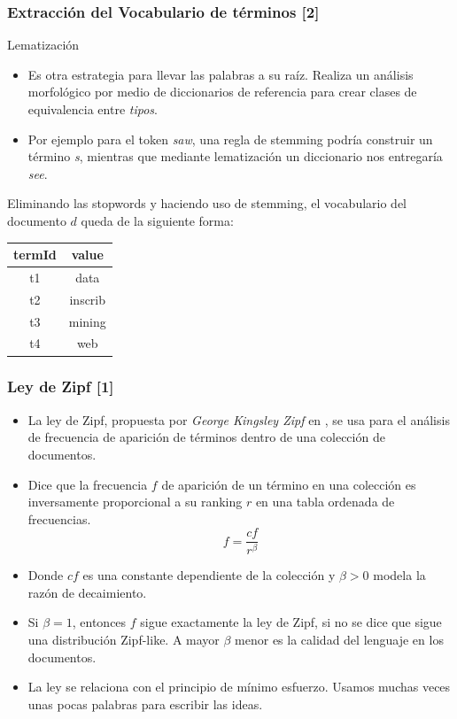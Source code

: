 \documentclass[mathserif]{beamer}
\begin{document}
\begin{frame}\frametitle{Extracción del Vocabulario de términos [2]}
\footnotesize{
 
\begin{block}{Lematización}
\begin{itemize}
 \item Es otra estrategia para llevar las palabras a su raíz. Realiza un análisis morfológico por medio de diccionarios de referencia para crear clases de equivalencia entre \emph{tipos}. 
\item Por ejemplo para el token \emph{saw}, una regla de stemming podría construir un término \emph{s}, mientras que mediante lematización un diccionario nos entregaría \emph{see}. 

\end{itemize}
\end{block}

Eliminando las stopwords y haciendo uso de stemming, el vocabulario del documento $d$ queda de la siguiente forma:

\begin{table}
\centering
\begin{tabular}{c|c}
\hline
termId & value \\ 
\hline
t1 & data \\ 
t2 & inscrib \\ 
t3 & mining \\ 
t4 & web \\ 
\hline
\end{tabular}
\end{table}

}
\end{frame}



\begin{frame}\frametitle{Ley de Zipf [1]}
\footnotesize{
\begin{itemize}
 \item La ley de Zipf, propuesta por \emph{George Kingsley Zipf} en \cite{zipf1935}, se usa para el análisis de frecuencia de aparición de términos dentro de una colección de documentos. 
\item Dice que la frecuencia $f$ de aparición de un término en una colección es inversamente proporcional a su ranking $r$ en una tabla ordenada de frecuencias.
\begin{equation}
	f = \frac{cf}{r^{\beta}}
\end{equation}
\item Donde $cf$ es una constante dependiente de la colección  y $\beta > 0$ modela la razón de decaimiento.
\item Si $\beta = 1$, entonces $f$ sigue exactamente la ley de Zipf, si no se dice que sigue una distribución Zipf-like. A mayor $\beta$ menor es la calidad del lenguaje en los documentos. 

\item La ley se relaciona con el principio de mínimo esfuerzo. Usamos muchas veces unas pocas palabras para escribir las ideas.

\end{itemize}


}
 
\end{frame}
\end{document}
